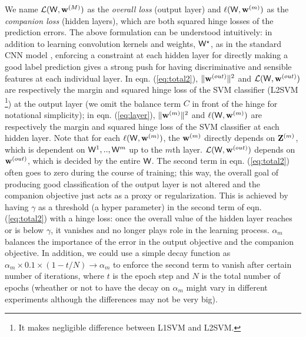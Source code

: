 \documentclass{article} %
\newcommand{\cW}{{\bf \mathsf{W}}}
\newcommand{\cZ}{{\bf Z}}
\newcommand{\sw}{{\bf w}}
\newcommand{\cL}{\mathcal{L}}
\newcommand{\sL}{\ell}
\begin{document}
We name $\cL(\cW, \sw^{(M)})$ as the {\em overall loss} (output layer) and $\sL(\cW, \sw^{(m)})$  as the {\em companion loss} (hidden layers), which are both squared hinge losses of the prediction errors. %
The above formulation can be understood intuitively: in addition to learning convolution kernels and weights, $\cW^{\star}$, as in the standard CNN model \cite{CNN}, enforcing a constraint at each hidden layer for directly making a good label prediction gives a strong push for having discriminative and sensible features at each individual layer.
In eqn. (\ref{eq:total2}), $\lVert \sw^{(out)} \rVert^2$ and $\cL(\cW, \sw^{(out)})$
are respectively the margin and squared hinge loss of the SVM classifier (L2SVM \footnote{It makes negligible difference between L1SVM and L2SVM.}) at the output layer (we omit the balance term $C$ in front of the hinge for notational simplicity);
in eqn. (\ref{eq:layer}), $\lVert \sw^{(m)} \rVert^2$ and $\sL(\cW, \sw^{(m)})$ are respectively the margin and squared hinge loss of the SVM classifier at each hidden layer. Note that for each $\sL(\cW, \sw^{(m)})$,
the $\sw^{(m)}$ directly depends on $\cZ^{(m)}$, which is dependent on $\cW^{1},..,\cW^{m}$ up to the $m$th layer. $\cL(\cW, \sw^{(out)})$ depends on $\sw^{(out)}$, which is decided by the entire $\cW$. The second term  in eqn. (\ref{eq:total2}) often goes to zero during the course of training; this way, the overall goal of producing good classification of the output layer is not altered and the companion objective just acts as a proxy or regularization.  This is achieved by having $\gamma$ as a threshold (a hyper parameter) in the second term of eqn. (\ref{eq:total2}) with a hinge loss: once the overall value of the hidden layer reaches or is below $\gamma$, it vanishes and no longer plays role in the learning process.  $\alpha_m$ balances the importance of the error in the output objective and the companion objective. In addition, we could use a simple decay function as $\alpha_m \times 0.1 \times (1-t/N) \rightarrow \alpha_m$ to enforce the second term to vanish after certain number of iterations, where $t$ is the epoch step and $N$ is the total number of epochs (wheather or not to have the decay on $\alpha_m$ might vary in different experiments although the differences may not be very big).
\end{document}
